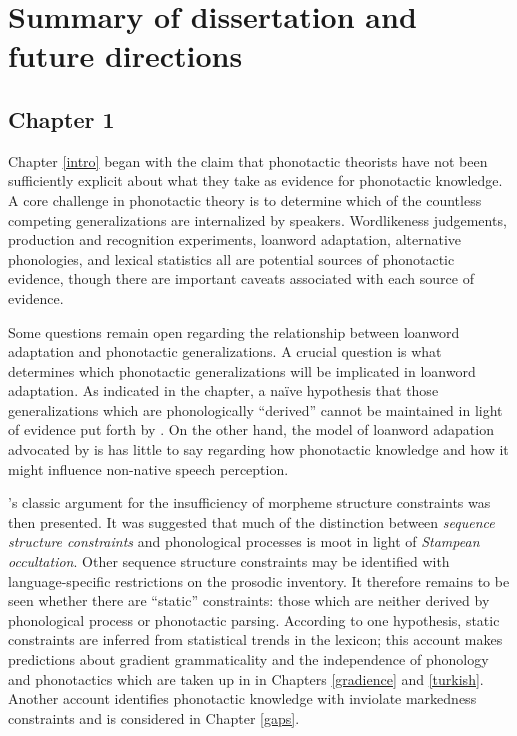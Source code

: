 \label{conclusions}

\section{Summary of dissertation and future directions}

\subsection{Chapter 1}

Chapter \ref{intro} began with the claim that phonotactic theorists have not been sufficiently explicit about what they take as evidence for phonotactic knowledge.
A core challenge in phonotactic theory is to determine which of the countless competing generalizations are internalized by speakers.
Wordlikeness judgements, production and recognition experiments, loanword adaptation, alternative phonologies, and lexical statistics all are potential sources of phonotactic evidence, though there are important caveats associated with each source of evidence.

Some questions remain open regarding the relationship between loanword adaptation and phonotactic generalizations.
A crucial question is what determines which phonotactic generalizations will be implicated in loanword adaptation. 
As indicated in the chapter, a naïve hypothesis that those generalizations which are phonologically ``derived'' cannot be maintained in light of evidence put forth by \citet{Peperkamp2005}.
On the other hand, the model of loanword adapation advocated by \citeauthor{Peperkamp2005} is has little to say regarding how phonotactic knowledge and how it might influence non-native speech perception.

\citeauthor{Shibatani1973}'s classic argument for the insufficiency of morpheme structure constraints was then presented.
It was suggested that much of the distinction between \emph{sequence structure constraints} and phonological processes is moot in light of \emph{Stampean occultation}.
Other sequence structure constraints may be identified with language-specific restrictions on the prosodic inventory.
It therefore remains to be seen whether there are ``static'' constraints: those which are neither derived by phonological process or phonotactic parsing. 
According to one hypothesis, static constraints are inferred from statistical trends in the lexicon; this account makes predictions about gradient grammaticality and the independence of phonology and phonotactics which are taken up in in Chapters \ref{gradience} and \ref{turkish}.
Another account identifies phonotactic knowledge with inviolate markedness constraints and is considered in Chapter \ref{gaps}.

